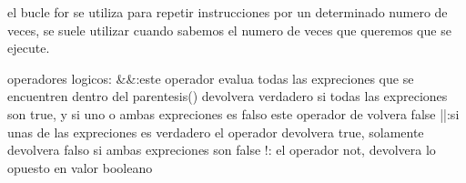 el bucle for se utiliza para repetir instrucciones por un determinado numero de veces, se suele
utilizar cuando sabemos el numero de veces que queremos que se ejecute.

operadores logicos:
                   &&:este operador evalua todas las expreciones que se encuentren dentro del
parentesis() devolvera verdadero si todas las expreciones son true, y si uno o ambas expreciones es 
falso este operador de volvera false
                   ||:si unas de las expreciones es verdadero el operador devolvera true, 
solamente devolvera falso si ambas expreciones son false
                   !: el operador not, devolvera lo opuesto en valor booleano 